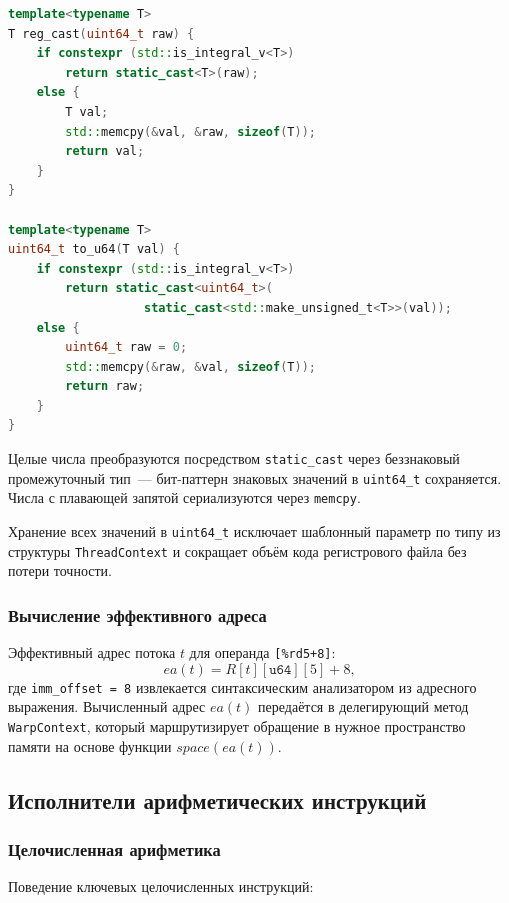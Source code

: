\begin{lstlisting}[language=C++, caption={Примитивы доступа к регистрам}]
template<typename T>
T reg_cast(uint64_t raw) {
    if constexpr (std::is_integral_v<T>)
        return static_cast<T>(raw);
    else {
        T val;
        std::memcpy(&val, &raw, sizeof(T));
        return val;
    }
}

template<typename T>
uint64_t to_u64(T val) {
    if constexpr (std::is_integral_v<T>)
        return static_cast<uint64_t>(
                   static_cast<std::make_unsigned_t<T>>(val));
    else {
        uint64_t raw = 0;
        std::memcpy(&raw, &val, sizeof(T));
        return raw;
    }
}
\end{lstlisting}

Целые числа преобразуются посредством \texttt{static\_cast} через беззнаковый
промежуточный тип~--- бит-паттерн знаковых значений в \texttt{uint64\_t}
сохраняется. Числа с плавающей запятой сериализуются через \texttt{memcpy}.

Хранение всех значений в \texttt{uint64\_t} исключает шаблонный
параметр по типу из структуры \texttt{ThreadContext} и сокращает
объём кода регистрового файла без потери точности.

\subsubsection{Вычисление эффективного адреса}

Эффективный адрес потока $t$ для операнда \texttt{[\%rd5+8]}:
\begin{equation}
  ea(t) = R[t][\mathtt{u64}][5] + 8,
\end{equation}
где \texttt{imm\_offset~= 8} извлекается синтаксическим анализатором из адресного выражения.
Вычисленный адрес $ea(t)$ передаётся в делегирующий метод
\texttt{WarpContext}, который маршрутизирует обращение в нужное
пространство памяти на основе функции $\mathit{space}(ea(t))$.

\subsection{Исполнители арифметических инструкций}

\subsubsection{Целочисленная арифметика}

Поведение ключевых целочисленных инструкций:

